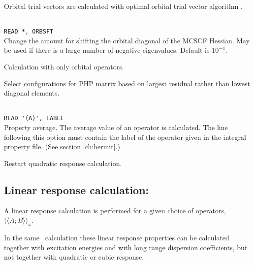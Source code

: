 \begin{description}
\item{}
Orbital trial vectors are calculated with optimal orbital
trial vector
algorithm \cite{tuhjahjajpjjcp84}.

\item{}\\
\verb|READ *, ORBSFT|\\
Change the amount for shifting the orbital
diagonal of the MCSCF Hessian.
May be used if there is a large number of negative eigenvalues.
Default is $10^{-4}$. 

\item{}
Calculation with only orbital operators. 

\item{}
Select configurations for PHP matrix based on largest residual
rather than lowest diagonal elements.

\item{} \\
\verb|READ '(A)', LABEL|\\
Property average. The average value of an
operator is calculated. 
The line following this option must contain the
label of the operator given in the integral property file.
(See section \ref{ch:hermit}.)

\item{}
Restart quadratic response
calculation.
\end{description}

\subsection{Linear response calculation: }

A linear response
\cite{jodlypjjcp91,pjhjajjojcp89} calculation is performed for a given
choice of operators,
$\langle\!\langle A; B \rangle\!\rangle_{\omega}$.

In the same \resp\ calculation these linear response properties can be calculated
together with excitation energies
and with long range dispersion coefficients, but not 
together with quadratic or cubic response.


